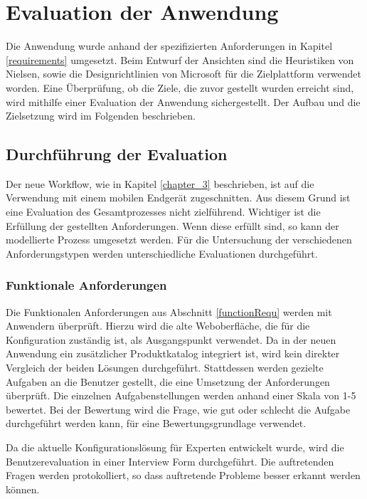 \chapter{Evaluation der Anwendung}\label{chapter_6}
Die Anwendung wurde anhand der spezifizierten Anforderungen in Kapitel \ref{requirements} umgesetzt. Beim Entwurf der Ansichten sind die Heuristiken von Nielsen, sowie die Designrichtlinien von Microsoft für die Zielplattform verwendet worden. Eine Überprüfung, ob die Ziele, die zuvor gestellt wurden erreicht sind, wird mithilfe einer Evaluation der Anwendung sichergestellt. Der Aufbau und die Zielsetzung wird im Folgenden beschrieben. 

\section{Durchführung der Evaluation}
Der neue Workflow, wie in Kapitel \ref{chapter_3} beschrieben, ist auf die Verwendung mit einem mobilen Endgerät zugeschnitten. Aus diesem Grund ist eine Evaluation des Gesamtprozesses nicht zielführend. Wichtiger ist die Erfüllung der gestellten Anforderungen. Wenn diese erfüllt sind, so kann der modellierte Prozess umgesetzt werden. Für die Untersuchung der verschiedenen Anforderungstypen werden unterschiedliche Evaluationen durchgeführt.

\subsection{Funktionale Anforderungen}
Die Funktionalen Anforderungen aus Abschnitt \ref{functionRequ} werden mit Anwendern überprüft. Hierzu wird die alte Weboberfläche, die für die Konfiguration zuständig ist, als Ausgangspunkt verwendet. Da in der neuen Anwendung ein zusätzlicher Produktkatalog integriert ist, wird kein direkter Vergleich der beiden Lösungen durchgeführt. Stattdessen werden gezielte Aufgaben an die Benutzer gestellt, die eine Umsetzung der Anforderungen überprüft. Die einzelnen Aufgabenstellungen werden anhand einer Skala von 1-5 bewertet. Bei der Bewertung wird die Frage, wie gut oder schlecht die Aufgabe durchgeführt werden kann, für eine Bewertungsgrundlage verwendet. 

Da die aktuelle Konfigurationslösung für Experten entwickelt wurde, wird die Benutzerevaluation in einer Interview Form durchgeführt. Die auftretenden Fragen werden protokolliert, so dass auftretende Probleme besser erkannt werden können. 

